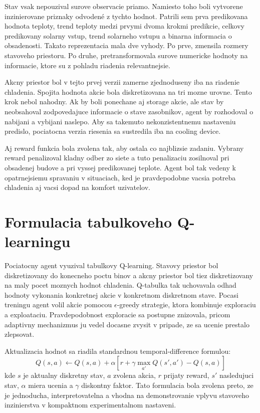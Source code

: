 \documentclass[conference]{IEEEtran}
\begin{document}
Stav vsak nepouzival surove observacie priamo. Namiesto toho boli vytvorene inzinierovane priznaky odvodené z tychto hodnot. Patrili sem prva predikovana hodnota teploty, trend teploty medzi prvymi dvoma krokmi predikcie, celkovy predikovany solarny vstup, trend solarneho vstupu a binarna informacia o obsadenosti. Takato reprezentacia mala dve vyhody. Po prve, zmensila rozmery stavoveho priestoru. Po druhe, pretransformovala surove numericke hodnoty na informacie, ktore su z pohladu riadenia relevantnejsie.

Akcny priestor bol v tejto prvej verzii zamerne zjednoduseny iba na riadenie chladenia. Spojita hodnota akcie bola diskretizovana na tri mozne urovne. Tento krok nebol nahodny. Ak by boli ponechane aj storage akcie, ale stav by neobsahoval zodpovedajuce informacie o stave zasobnikov, agent by rozhodoval o nabijani a vybijani naslepo. Aby sa takemuto nekonzistentnemu nastaveniu predislo, pociatocna verzia riesenia sa sustredila iba na cooling device.

Aj reward funkcia bola zvolena tak, aby ostala co najblizsie zadaniu. Vybrany reward penalizoval kladny odber zo siete a tuto penalizaciu zosilnoval pri obsadenej budove a pri vyssej predikovanej teplote. Agent bol tak vedeny k opatrnejsiemu spravaniu v situaciach, ked je pravdepodobne vacsia potreba chladenia aj vacsi dopad na komfort uzivatelov.

\section{Formulacia tabulkoveho Q-learningu}
Pociatocny agent vyuzival tabulkovy Q-learning. Stavovy priestor bol diskretizovany do konecneho poctu binov a akcny priestor bol tiez diskretizovany na maly pocet moznych hodnot chladenia. Q-tabulka tak uchovavala odhad hodnoty vykonania konkretnej akcie v konkretnom diskretnom stave. Pocasi treningu agent volil akcie pomocou $\epsilon$-greedy strategie, ktora kombinuje exploraciu a exploataciu. Pravdepodobnost exploracie sa postupne znizovala, pricom adaptivny mechanizmus ju vedel docasne zvysit v pripade, ze sa ucenie prestalo zlepsovat.

Aktualizacia hodnot sa riadila standardnou temporal-difference formulou:
\begin{equation}
Q(s,a) \leftarrow Q(s,a) + \alpha \left[r + \gamma \max_{a'}Q(s',a') - Q(s,a)\right]
\end{equation}
kde $s$ je aktualny diskretny stav, $a$ zvolena akcia, $r$ prijaty reward, $s'$ nasledujuci stav, $\alpha$ miera ucenia a $\gamma$ diskontny faktor. Tato formulacia bola zvolena preto, ze je jednoducha, interpretovatelna a vhodna na demonstrovanie vplyvu stavoveho inzinierstva v kompaktnom experimentalnom nastaveni.
\end{document}
